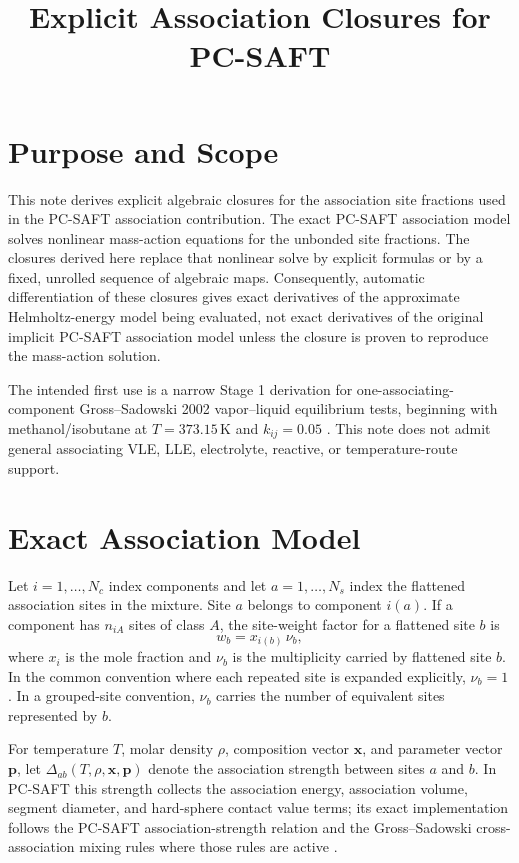\documentclass[12pt,letterpaper]{article}
\title{Explicit Association Closures for PC-SAFT}
\author{}
\date{}
\begin{document}
\maketitle

\section{Purpose and Scope}

This note derives explicit algebraic closures for the association site fractions
used in the PC-SAFT association contribution. The exact PC-SAFT association
model solves nonlinear mass-action equations for the unbonded site fractions.
The closures derived here replace that nonlinear solve by explicit formulas or
by a fixed, unrolled sequence of algebraic maps. Consequently, automatic
differentiation of these closures gives exact derivatives of the approximate
Helmholtz-energy model being evaluated, not exact derivatives of the original
implicit PC-SAFT association model unless the closure is proven to reproduce the
mass-action solution.

The intended first use is a narrow Stage 1 derivation for one-associating-
component Gross--Sadowski 2002 vapor--liquid equilibrium tests, beginning with
methanol/isobutane at \(T=373.15\,\mathrm{K}\) and \(k_{ij}=0.05\)
\cite{Gross2002}. This note does not admit general associating VLE, LLE,
electrolyte, reactive, or temperature-route support.

\section{Exact Association Model}

Let \(i=1,\dots,N_c\) index components and let \(a=1,\dots,N_s\) index the
flattened association sites in the mixture. Site \(a\) belongs to component
\(i(a)\). If a component has \(n_{iA}\) sites of class \(A\), the site-weight
factor for a flattened site \(b\) is
\begin{equation}
  w_b = x_{i(b)}\,\nu_b,
  \label{eq:site_weight}
\end{equation}
where \(x_i\) is the mole fraction and \(\nu_b\) is the multiplicity carried by
flattened site \(b\). In the common convention where each repeated site is
expanded explicitly, \(\nu_b=1\). In a grouped-site convention, \(\nu_b\) carries
the number of equivalent sites represented by \(b\).

For temperature \(T\), molar density \(\rho\), composition vector \(\mathbf{x}\),
and parameter vector \(\mathbf{p}\), let
\(\Delta_{ab}(T,\rho,\mathbf{x},\mathbf{p})\) denote the association strength
between sites \(a\) and \(b\). In PC-SAFT this strength collects the association
energy, association volume, segment diameter, and hard-sphere contact value
terms; its exact implementation follows the PC-SAFT association-strength
relation and the Gross--Sadowski cross-association mixing rules where those
rules are active \cite{Gross2002,Chapman1989,Chapman1990,Huang1990}.
\end{document}
